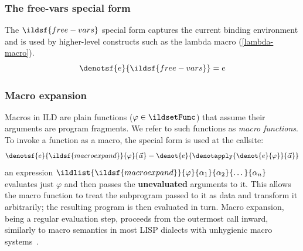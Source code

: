 \subsubsection{The free-vars special form}
The \(\ildsf{free-vars}\) special form captures the current binding environment and is used by higher-level constructs
such as the lambda macro (\cref{lambda-macro}).
\begin{equation}
    \denotsf{e}{\ildsf{free-vars}} = e
\end{equation}
\subsubsection{Macro expansion}
\label{macroexpand-mechanism}
Macros in ILD are plain functions (\(\varphi \in \ildsetFunc\)) that assume their arguments
are program fragments. We refer to such functions as \emph{macro functions}.
To invoke a function as a macro, the special form
 is used at the callsite:
\begin{equation}
  \denotsf{e}{\ildsf{macroexpand}}{\varphi}{\vec{\alpha}}
  = \denot{e}{\denotapply{\denot{e}{\varphi}}{\vec{\alpha}}}
\end{equation}
an expression
\(\ildlist{\ildsf{macroexpand}}{\varphi}{\alpha_1}{\alpha_2}{\dots}{\alpha_n}\)
evaluates just \(\varphi\) and then passes the
\textbf{unevaluated} arguments to it. This allows the macro function to treat the subprogram
passed to it as data and transform it arbitrarily; the resulting program is then
evaluated in turn. Macro expansion, being a regular evaluation step,
proceeds from the outermost call inward, similarly to macro semantics
in most LISP dialects with unhygienic macro systems~\cite{steele-gabriel-evolution,kohlbecker1986syntactic}.

